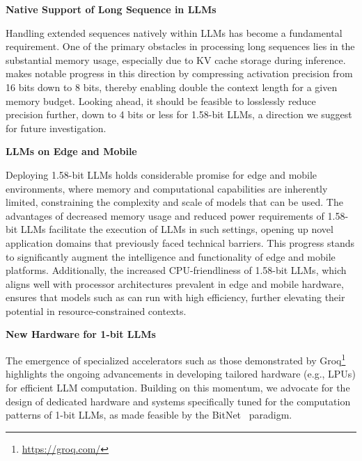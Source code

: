 \textbf{Native Support of Long Sequence in LLMs}

Handling extended sequences natively within LLMs has become a fundamental requirement. One of the primary obstacles in processing long sequences lies in the substantial memory usage, especially due to KV cache storage during inference.  makes notable progress in this direction by compressing activation precision from 16 bits down to 8 bits, thereby enabling double the context length for a given memory budget. Looking ahead, it should be feasible to losslessly reduce precision further, down to 4 bits or less for 1.58-bit LLMs, a direction we suggest for future investigation.

\textbf{LLMs on Edge and Mobile}

Deploying 1.58-bit LLMs holds considerable promise for edge and mobile environments, where memory and computational capabilities are inherently limited, constraining the complexity and scale of models that can be used. The advantages of decreased memory usage and reduced power requirements of 1.58-bit LLMs facilitate the execution of LLMs in such settings, opening up novel application domains that previously faced technical barriers. This progress stands to significantly augment the intelligence and functionality of edge and mobile platforms. Additionally, the increased CPU-friendliness of 1.58-bit LLMs, which aligns well with processor architectures prevalent in edge and mobile hardware, ensures that models such as  can run with high efficiency, further elevating their potential in resource-constrained contexts.

\textbf{New Hardware for 1-bit LLMs}

The emergence of specialized accelerators such as those demonstrated by Groq\footnote{\url{https://groq.com/}} highlights the ongoing advancements in developing tailored hardware (e.g., LPUs) for efficient LLM computation. Building on this momentum, we advocate for the design of dedicated hardware and systems specifically tuned for the computation patterns of 1-bit LLMs, as made feasible by the BitNet~\cite{bitnet} paradigm.